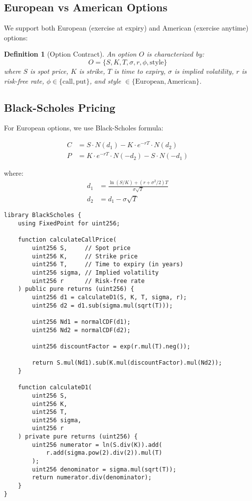 \documentclass[11pt,a4paper]{article}
\newtheorem{definition}[theorem]{Definition}
\begin{document}
\subsection{European vs American Options}

We support both European (exercise at expiry) and American (exercise anytime) options:

\begin{definition}[Option Contract]
An option $O$ is characterized by:
\begin{equation}
O = \{S, K, T, \sigma, r, \phi, \text{style}\}
\end{equation}
where $S$ is spot price, $K$ is strike, $T$ is time to expiry, $\sigma$ is implied volatility, $r$ is risk-free rate, $\phi \in \{\text{call}, \text{put}\}$, and style $\in \{\text{European}, \text{American}\}$.
\end{definition}

\subsection{Black-Scholes Pricing}

For European options, we use Black-Scholes formula:

\begin{align}
C &= S \cdot N(d_1) - K \cdot e^{-rT} \cdot N(d_2) \\
P &= K \cdot e^{-rT} \cdot N(-d_2) - S \cdot N(-d_1)
\end{align}

where:
\begin{align}
d_1 &= \frac{\ln(S/K) + (r + \sigma^2/2)T}{\sigma\sqrt{T}} \\
d_2 &= d_1 - \sigma\sqrt{T}
\end{align}

\begin{lstlisting}[caption={Black-Scholes Implementation}]
library BlackScholes {
    using FixedPoint for uint256;

    function calculateCallPrice(
        uint256 S,     // Spot price
        uint256 K,     // Strike price
        uint256 T,     // Time to expiry (in years)
        uint256 sigma, // Implied volatility
        uint256 r      // Risk-free rate
    ) public pure returns (uint256) {
        uint256 d1 = calculateD1(S, K, T, sigma, r);
        uint256 d2 = d1.sub(sigma.mul(sqrt(T)));

        uint256 Nd1 = normalCDF(d1);
        uint256 Nd2 = normalCDF(d2);

        uint256 discountFactor = exp(r.mul(T).neg());

        return S.mul(Nd1).sub(K.mul(discountFactor).mul(Nd2));
    }

    function calculateD1(
        uint256 S,
        uint256 K,
        uint256 T,
        uint256 sigma,
        uint256 r
    ) private pure returns (uint256) {
        uint256 numerator = ln(S.div(K)).add(
            r.add(sigma.pow(2).div(2)).mul(T)
        );
        uint256 denominator = sigma.mul(sqrt(T));
        return numerator.div(denominator);
    }
}
\end{lstlisting}
\end{document}
